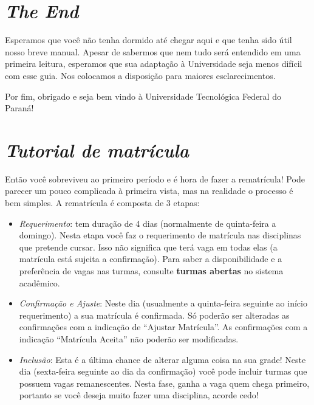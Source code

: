 \documentclass[a4paper,12pt,openany]{article}
\begin{document}
\newpage
\section{\textit{The End}}

Esperamos que você não tenha dormido até chegar aqui e que tenha sido útil nosso breve manual. Apesar de sabermos que nem tudo será entendido em uma primeira leitura, esperamos que sua adaptação à Universidade seja menos difícil com esse guia. Nos colocamos a disposição para maiores esclarecimentos. 

Por fim, obrigado e seja bem vindo à Universidade Tecnológica Federal do Paraná!


\newpage
\section{\textit{Tutorial de matrícula}}

Então você sobreviveu ao primeiro período e é hora de fazer a rematrícula! Pode parecer um pouco complicada à primeira vista, mas na realidade o processo é bem simples. A rematrícula é composta de 3 etapas:

\begin{itemize}
\item \textit{Requerimento}: tem duração de 4 dias (normalmente de quinta-feira a domingo). Nesta etapa você faz o requerimento de matrícula nas disciplinas que pretende cursar. Isso não significa que terá vaga em todas elas (a matrícula está sujeita a confirmação). Para saber a disponibilidade e a preferência de vagas nas turmas, consulte \textbf{turmas abertas} no sistema acadêmico.

\item \textit {Confirmação e Ajuste}: Neste dia (usualmente a quinta-feira seguinte ao início requerimento) a sua matrícula é confirmada. Só poderão ser alteradas as confirmações com a indicação de ``Ajustar Matrícula''. As confirmações com a indicação ``Matrícula Aceita'' não poderão ser modificadas.

\item \textit{Inclusão}: Esta é a última chance de alterar alguma coisa na sua grade! Neste dia (sexta-feira seguinte ao dia da confirmação) você pode incluir turmas que possuem vagas remanescentes. Nesta fase, ganha a vaga quem chega primeiro, portanto se você deseja muito fazer uma disciplina, acorde cedo!

\end{itemize}
\end{document}
